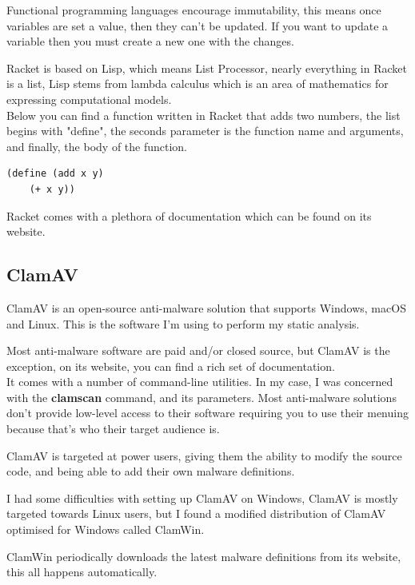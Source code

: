 Functional programming languages encourage immutability,
this means once variables are set a value, then they can't be updated.
If you want to update a variable then you must create a new one with
the changes.

Racket is based on Lisp, which means List Processor,
nearly everything in Racket is a list,
Lisp stems from lambda calculus which is an area
of mathematics for expressing computational models. \\

Below you can find a function written in Racket that adds two numbers,
the list begins with "define", the seconds parameter is the function name and arguments,
and finally, the body of the function.

\begin{lstlisting}
(define (add x y)
    (+ x y))
\end{lstlisting}

Racket comes with a plethora of documentation which can be found on its website.

\subsection{ClamAV}
ClamAV is an open-source anti-malware solution that
supports Windows, macOS and Linux. \cite{clamav}
This is the software I'm using to perform my static analysis.

Most anti-malware software are paid and/or closed source,
but ClamAV is the exception, on its website, you can find a rich set of documentation. \\

It comes with a number of command-line utilities.
In my case, I was concerned with the \textbf{clamscan} command, and its parameters.
Most anti-malware solutions don't provide low-level access to their software
requiring you to use their menuing because that's who their target audience is.

ClamAV is targeted at power users,
giving them the ability to modify the source code,
and being able to add their own malware definitions.

I had some difficulties with setting up ClamAV on Windows,
ClamAV is mostly targeted towards Linux users,
but I found a modified distribution of ClamAV optimised for Windows
called ClamWin.

ClamWin periodically downloads the latest malware
definitions from its website,
this all happens automatically. \\

